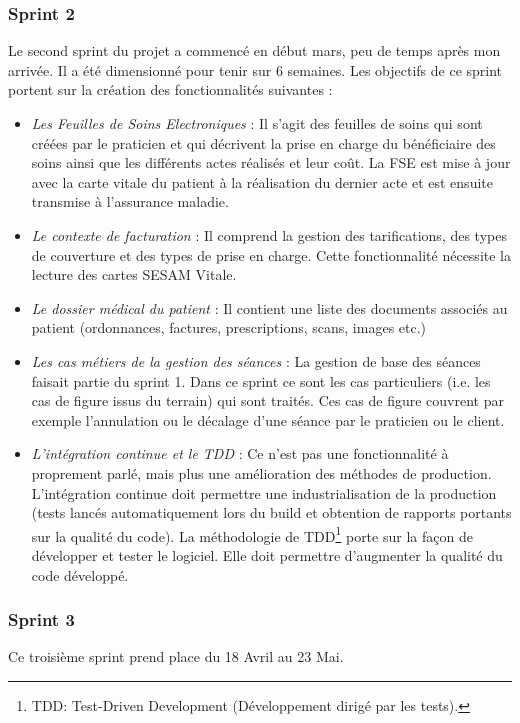 \subsubsection{Sprint 2}
Le second sprint du projet a commencé en début mars, peu de temps après mon arrivée. Il a été dimensionné pour tenir sur 6 semaines.
Les objectifs de ce sprint portent sur la création des fonctionnalités suivantes : 
\begin{itemize}
\item \textit{Les Feuilles de Soins Electroniques} : Il s'agit des feuilles de soins qui sont créées par le praticien et qui décrivent la prise en charge du bénéficiaire des soins ainsi que les différents actes réalisés et leur coût. La \gls{FSE} est mise à jour avec la carte vitale du patient à la réalisation du dernier acte et est ensuite transmise à l'assurance maladie.
\item \textit{Le contexte de facturation} : Il comprend la gestion des tarifications, des types de couverture et des types de prise en charge. Cette fonctionnalité nécessite la lecture des cartes SESAM Vitale.
\item \textit{Le dossier médical du patient} : Il contient une liste des documents associés au patient (ordonnances, factures, prescriptions, scans, images etc.)
\item \textit{Les cas métiers de la gestion des séances} : La gestion de base des séances faisait partie du sprint 1. Dans ce sprint ce sont les cas particuliers (i.e. les cas de figure issus du terrain) qui sont traités. Ces cas de figure couvrent par exemple l'annulation ou le décalage d'une séance par le praticien ou le client.
\item \textit{L'intégration continue et le TDD} : Ce n'est pas une fonctionnalité à proprement parlé, mais plus une amélioration des méthodes de production. L'intégration continue doit permettre une industrialisation de la production (tests lancés automatiquement lors du build et obtention de rapports portants sur la qualité du code). La méthodologie de TDD\footnote{TDD: Test-Driven Development (Développement dirigé par les tests).} porte sur la façon de développer et tester le logiciel. Elle doit permettre d'augmenter la qualité du code développé.
\end{itemize}

\subsubsection{Sprint 3} 
Ce troisième sprint prend place du 18 Avril au 23 Mai. 

